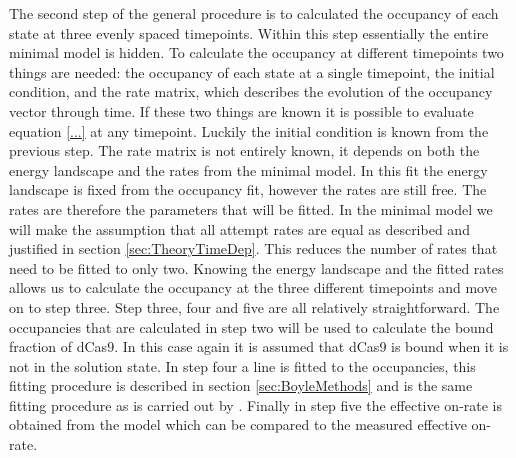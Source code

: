 The second step of the general procedure is to calculated the occupancy of each state at three evenly spaced timepoints. Within this step essentially the entire minimal model is hidden. To calculate the occupancy at different timepoints two things are needed: the occupancy of each state at a single timepoint, the initial condition, and the rate matrix, which describes the evolution of the occupancy vector through time. If these two things are known it is possible to evaluate equation \ref{...} at any timepoint. Luckily the initial condition is known from the previous step. The rate matrix is not entirely known, it depends on both the energy landscape and the rates from the minimal model. In this fit the energy landscape is fixed from the occupancy fit, however the rates are still free. The rates are therefore the parameters that will be fitted. In the minimal model we will make the assumption that all attempt rates are equal as described and justified in section \ref{sec:TheoryTimeDep}. This reduces the number of rates that need to be fitted to only two. Knowing the energy landscape and the fitted rates allows us to calculate the occupancy at the three different timepoints and move on to step three. Step three, four and five are all relatively straightforward. The occupancies that are calculated in step two will be used to calculate the bound fraction of dCas9. In this case again it is assumed that dCas9 is bound when it is not in the solution state. In step four a line is fitted to the occupancies, this fitting procedure is described in section \ref{sec:BoyleMethods} and is the same fitting procedure as is carried out by \cite{PNAS}. Finally in step five the effective on-rate is obtained from the model which can be compared to the measured effective on-rate. 

